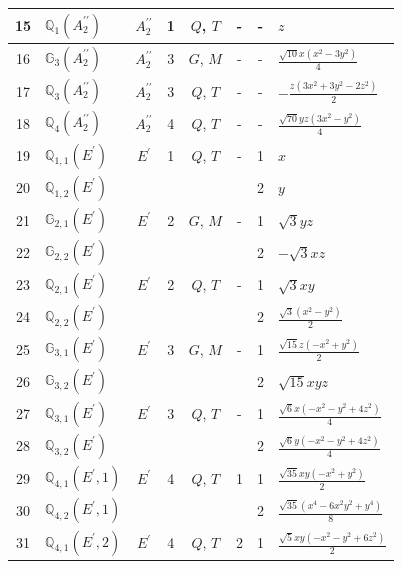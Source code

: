 \documentclass[fleqn,10pt,landscape]{jsarticle}
\begin{document}
\begin{longtable}[l]{clcccccl}
15 & $\mathbb{Q}_{1}(A_{2}^{\prime\prime})$ & $A_{2}^{\prime\prime}$ & 1 & $Q$, $T$ & - & - & $z$ \\ \hline
16 & $\mathbb{G}_{3}(A_{2}^{\prime\prime})$ & $A_{2}^{\prime\prime}$ & 3 & $G$, $M$ & - & - & $\frac{\sqrt{10} x \left(x^{2} - 3 y^{2}\right)}{4}$ \\ \hline
17 & $\mathbb{Q}_{3}(A_{2}^{\prime\prime})$ & $A_{2}^{\prime\prime}$ & 3 & $Q$, $T$ & - & - & $- \frac{z \left(3 x^{2} + 3 y^{2} - 2 z^{2}\right)}{2}$ \\ \hline
18 & $\mathbb{Q}_{4}(A_{2}^{\prime\prime})$ & $A_{2}^{\prime\prime}$ & 4 & $Q$, $T$ & - & - & $\frac{\sqrt{70} y z \left(3 x^{2} - y^{2}\right)}{4}$ \\ \hline
19 & $\mathbb{Q}_{1,1}(E^{\prime})$ & $E^{\prime}$ & 1 & $Q$, $T$ & - & 1 & $x$ \\
20 & $\mathbb{Q}_{1,2}(E^{\prime})$ &  &  &  &  & 2 & $y$ \\ \hline
21 & $\mathbb{G}_{2,1}(E^{\prime})$ & $E^{\prime}$ & 2 & $G$, $M$ & - & 1 & $\sqrt{3} y z$ \\
22 & $\mathbb{G}_{2,2}(E^{\prime})$ &  &  &  &  & 2 & $- \sqrt{3} x z$ \\ \hline
23 & $\mathbb{Q}_{2,1}(E^{\prime})$ & $E^{\prime}$ & 2 & $Q$, $T$ & - & 1 & $\sqrt{3} x y$ \\
24 & $\mathbb{Q}_{2,2}(E^{\prime})$ &  &  &  &  & 2 & $\frac{\sqrt{3} \left(x^{2} - y^{2}\right)}{2}$ \\ \hline
25 & $\mathbb{G}_{3,1}(E^{\prime})$ & $E^{\prime}$ & 3 & $G$, $M$ & - & 1 & $\frac{\sqrt{15} z \left(- x^{2} + y^{2}\right)}{2}$ \\
26 & $\mathbb{G}_{3,2}(E^{\prime})$ &  &  &  &  & 2 & $\sqrt{15} x y z$ \\ \hline
27 & $\mathbb{Q}_{3,1}(E^{\prime})$ & $E^{\prime}$ & 3 & $Q$, $T$ & - & 1 & $\frac{\sqrt{6} x \left(- x^{2} - y^{2} + 4 z^{2}\right)}{4}$ \\
28 & $\mathbb{Q}_{3,2}(E^{\prime})$ &  &  &  &  & 2 & $\frac{\sqrt{6} y \left(- x^{2} - y^{2} + 4 z^{2}\right)}{4}$ \\ \hline
29 & $\mathbb{Q}_{4,1}(E^{\prime},1)$ & $E^{\prime}$ & 4 & $Q$, $T$ & 1 & 1 & $\frac{\sqrt{35} x y \left(- x^{2} + y^{2}\right)}{2}$ \\
30 & $\mathbb{Q}_{4,2}(E^{\prime},1)$ &  &  &  &  & 2 & $\frac{\sqrt{35} \left(x^{4} - 6 x^{2} y^{2} + y^{4}\right)}{8}$ \\ \hline
31 & $\mathbb{Q}_{4,1}(E^{\prime},2)$ & $E^{\prime}$ & 4 & $Q$, $T$ & 2 & 1 & $\frac{\sqrt{5} x y \left(- x^{2} - y^{2} + 6 z^{2}\right)}{2}$ \\

\end{longtable}
\end{document}
